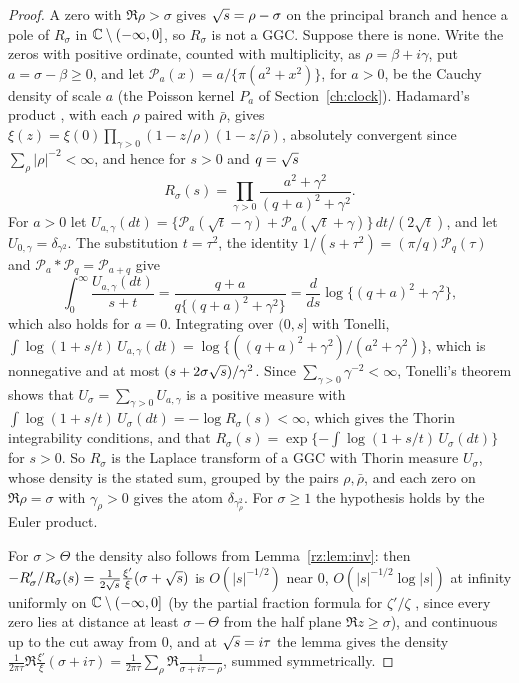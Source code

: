 \begin{proof}
A zero with $\Re\rho>\sigma$ gives $\sqrt{s}=\rho-\sigma$ on the principal branch and hence a pole of $R_\sigma$ in $\mathbb{C}\setminus(-\infty,0]$, so $R_\sigma$ is not a GGC. Suppose there is none. Write the zeros with positive ordinate, counted with multiplicity, as $\rho=\beta+i\gamma$, put $a=\sigma-\beta\ge0$, and let $\mathcal P_a(x)=a/\{\pi(a^2+x^2)\}$, for $a>0$, be the Cauchy density of scale $a$ (the Poisson kernel $P_a$ of Section~\ref{ch:clock}). Hadamard's product \cite[Chapter~12]{Davenport}, with each $\rho$ paired with $\bar\rho$, gives $\xi(z)=\xi(0)\prod_{\gamma>0}(1-z/\rho)(1-z/\bar\rho)$, absolutely convergent since $\sum_\rho|\rho|^{-2}<\infty$, and hence for $s>0$ and $q=\sqrt{s}$
\[
R_\sigma(s)=\prod_{\gamma>0}\frac{a^2+\gamma^2}{(q+a)^2+\gamma^2}.
\]
For $a>0$ let $U_{a,\gamma}(dt)=\{\mathcal P_a(\sqrt t-\gamma)+\mathcal P_a(\sqrt t+\gamma)\}\,dt/(2\sqrt t)$, and let $U_{0,\gamma}=\delta_{\gamma^2}$. The substitution $t=\tau^2$, the identity $1/(s+\tau^2)=(\pi/q)\mathcal P_q(\tau)$ and $\mathcal P_a*\mathcal P_q=\mathcal P_{a+q}$ give
\[
\int_0^\infty\frac{U_{a,\gamma}(dt)}{s+t}=\frac{q+a}{q\{(q+a)^2+\gamma^2\}}=\frac{d}{ds}\log\{(q+a)^2+\gamma^2\},
\]
which also holds for $a=0$. Integrating over $(0,s]$ with Tonelli, $\int\log(1+s/t)\,U_{a,\gamma}(dt)=\log\{((q+a)^2+\gamma^2)/(a^2+\gamma^2)\}$, which is nonnegative and at most $(s+2\sigma\sqrt{s})/\gamma^2$. Since $\sum_{\gamma>0}\gamma^{-2}<\infty$, Tonelli's theorem shows that $U_\sigma=\sum_{\gamma>0}U_{a,\gamma}$ is a positive measure with $\int\log(1+s/t)\,U_\sigma(dt)=-\log R_\sigma(s)<\infty$, which gives the Thorin integrability conditions, and that $R_\sigma(s)=\exp\{-\int\log(1+s/t)\,U_\sigma(dt)\}$ for $s>0$. So $R_\sigma$ is the Laplace transform of a GGC with Thorin measure $U_\sigma$, whose density is the stated sum, grouped by the pairs $\rho,\bar\rho$, and each zero on $\Re\rho=\sigma$ with $\gamma_\rho>0$ gives the atom $\delta_{\gamma_\rho^2}$. For $\sigma\ge1$ the hypothesis holds by the Euler product.

For $\sigma>\Theta$ the density also follows from Lemma~\ref{rz:lem:inv}: then $-R_\sigma'/R_\sigma(s)=\frac1{2\sqrt{s}}\frac{\xi'}\xi(\sigma+\sqrt{s})$ is $O(|s|^{-1/2})$ near $0$, $O(|s|^{-1/2}\log|s|)$ at infinity uniformly on $\mathbb{C}\setminus(-\infty,0]$ (by the partial fraction formula for $\zeta'/\zeta$ \cite[Chapter~15]{Davenport}, since every zero lies at distance at least $\sigma-\Theta$ from the half plane $\Re z\ge\sigma$), and continuous up to the cut away from $0$, and at $\sqrt{s}=i\tau$ the lemma gives the density $\frac1{2\pi\tau}\Re\frac{\xi'}\xi(\sigma+i\tau)=\frac1{2\pi\tau}\sum_\rho\Re\frac1{\sigma+i\tau-\rho}$, summed symmetrically.
\end{proof}


